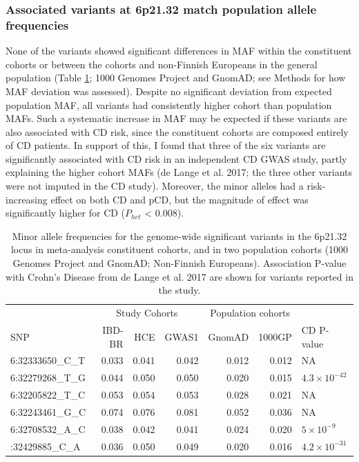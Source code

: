     \subsubsection{Associated variants at 6p21.32 match population allele frequencies}
    None of the variants showed significant differences in MAF within the constituent cohorts or between the cohorts and non-Finnish Europeans in the general population (Table \ref{table:maf_concord}; 1000 Genomes Project and GnomAD; see Methods for how MAF deviation was assessed). Despite no significant deviation from expected population MAF, all variants had consistently higher cohort than population MAFs. Such a systematic increase in MAF may be expected if these variants are also associated with CD risk, since the constituent cohorts are composed entirely of CD patients. 
    In support of this, I found that three of the six variants are significantly associated with CD risk in an independent CD GWAS study, partly explaining the higher cohort MAFs (de Lange et al. 2017; the three other variants were not imputed in the CD study). Moreover, the minor alleles had a risk-increasing effect on both CD and pCD, but the magnitude of effect was significantly higher for CD ($P_{het}$ < 0.008).

    
  \begin{table}[H]
    \centering\begingroup\fontsize{9}{11}\selectfont
    \caption{Minor allele frequencies for the genome-wide significant variants in the 6p21.32 locus in meta-analysis constituent cohorts, and in two population cohorts (1000 Genomes Project and GnomAD; Non-Finnish Europeans). Association P-value with Crohn's Disease from de Lange et al. 2017 are shown for variants reported in the study.}
    \label{table:maf_concord}
    \begin{tabular}[t]{lrrrrrl}
    \toprule
    \multicolumn{1}{c}{ } & \multicolumn{3}{c}{Study Cohorts} & \multicolumn{2}{c}{Population cohorts} & \multicolumn{1}{c}{ } \\
    \cmidrule(l{3pt}r{3pt}){2-4} \cmidrule(l{3pt}r{3pt}){5-6}
    SNP & IBD-BR & HCE & GWAS1 & GnomAD & 1000GP & CD P-value\\
    \midrule
    6:32333650\_C\_T & 0.033 & 0.041 & 0.042 & 0.012 & 0.012 & NA\\
    6:32279268\_T\_G & 0.044 & 0.050 & 0.050 & 0.020 & 0.015 & $4.3\times10^{-42}$\\
    6:32205822\_T\_C & 0.053 & 0.054 & 0.053 & 0.028 & 0.021 & NA\\
    6:32243461\_G\_C & 0.074 & 0.076 & 0.081 & 0.052 & 0.036 & NA\\
    6:32708532\_A\_C & 0.038 & 0.042 & 0.041 & 0.024 & 0.020 & $5\times10^{-9}$\\
    \addlinespace
    6:32429885\_C\_A & 0.036 & 0.050 & 0.049 & 0.020 & 0.016 & $4.2\times10^{-31}$\\
    \bottomrule
    \end{tabular}
    \endgroup{}
    \end{table}

